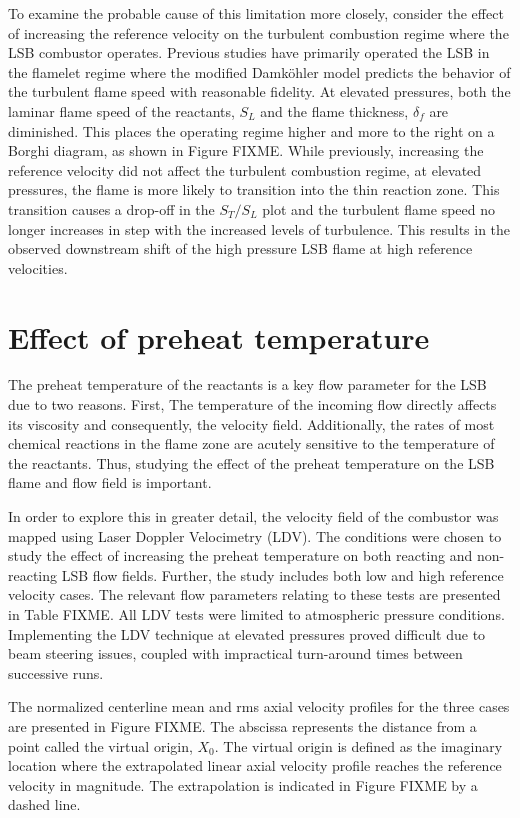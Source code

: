 To examine the probable cause of this limitation more closely, consider the effect of increasing the reference velocity on the turbulent combustion regime where the LSB combustor operates.
Previous studies have primarily operated the LSB in the flamelet regime where the modified Damk\"ohler model predicts the behavior of the turbulent flame speed with reasonable fidelity.
At elevated pressures, both the laminar flame speed of the reactants, \(S_L\) and the flame thickness, \(\delta_f\) are diminished.
This places the operating regime higher and more to the right on a Borghi diagram, as shown in Figure FIXME.
While previously, increasing the reference velocity did not affect the turbulent combustion regime, at elevated pressures, the flame is more likely to transition into the thin reaction zone.
This transition causes a drop-off in the \(S_T/S_L\) plot and the turbulent flame speed no longer increases in step with the increased levels of turbulence.
This results in the observed downstream shift of the high pressure LSB flame at high reference velocities.

\section{Effect of preheat temperature}
\label{sec:preheatEffect}

The preheat temperature of the reactants is a key flow parameter for the LSB due to two reasons.
First, The temperature of the incoming flow directly affects its viscosity and consequently, the velocity field.
Additionally, the rates of most chemical reactions in the flame zone are acutely sensitive to the temperature of the reactants.
Thus, studying the effect of the preheat temperature on the LSB flame and flow field is important.

In order to explore this in greater detail, the velocity field of the combustor was mapped using Laser Doppler Velocimetry (LDV).
The conditions were chosen to study the effect of increasing the preheat temperature on both reacting and non-reacting LSB flow fields.
Further, the study includes both low and high reference velocity cases.
The relevant flow parameters relating to these tests are presented in Table FIXME.
All LDV tests were limited to atmospheric pressure conditions.
Implementing the LDV technique at elevated pressures proved difficult due to beam steering issues, coupled with impractical turn-around times between successive runs.

The normalized centerline mean and rms axial velocity profiles for the three cases are presented in Figure FIXME.
The abscissa represents the distance from a point called the virtual origin, \(X_0\).
The virtual origin is defined as the imaginary location where the extrapolated linear axial velocity profile reaches the reference velocity in magnitude.
The extrapolation is indicated in Figure FIXME by a dashed line.

